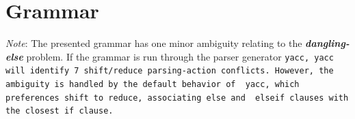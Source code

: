 \documentclass{report}
\begin{document}


\section{Grammar} %
\label{sec:grammar}

\emph{Note}: The presented grammar has one minor ambiguity relating to the
\textbf{\emph{dangling-else}} problem. If the grammar is run through the parser
generator \tt yacc\rm, \tt yacc \rm will identify 7 shift/reduce parsing-action
conflicts. However, the ambiguity is handled by the default behavior of \tt
yacc\rm, which preferences shift to reduce, associating \tt else \rm and \tt
elseif \rm clauses with the closest \tt if \rm clause.
\end{document}
